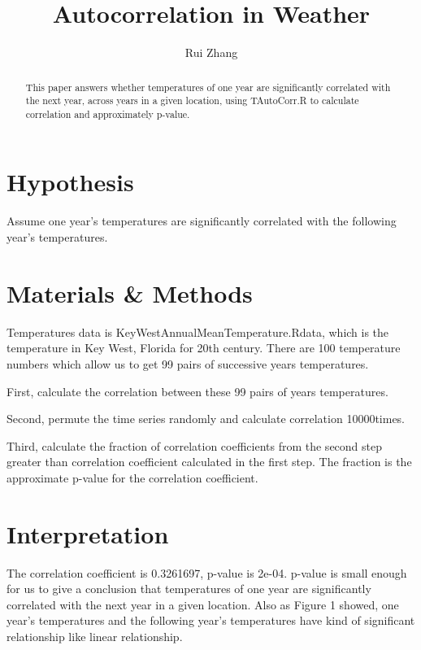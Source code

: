 \documentclass[12pt]{article}
\title{Autocorrelation in Weather}
\author{Rui Zhang}
\date{}
\begin{document}
  \maketitle
  
  \begin{abstract}
    This paper answers whether temperatures of one year are significantly correlated with the next year, across years in a given location, using TAutoCorr.R to calculate correlation and approximately p-value.
  \end{abstract}
  
  \section{Hypothesis}
    Assume one year's temperatures are significantly correlated with the following year's temperatures.
  
  \section{Materials \& Methods}
    Temperatures data is KeyWestAnnualMeanTemperature.Rdata, which is  the temperature in Key West, Florida for 20th century. There are 100 temperature numbers which allow us to get 99 pairs of successive years temperatures.
    
    First, calculate the correlation between these 99 pairs of years temperatures. 
    
    Second, permute the time series randomly and calculate correlation 10000times.
    
    Third, calculate the fraction of correlation coefficients from the second step greater than correlation coefficient calculated in the first step. The fraction is the approximate p-value for the correlation coefficient.
  
  \section{Interpretation}
  The correlation coefficient is 0.3261697, p-value is 2e-04. p-value is small enough for us to give a conclusion that temperatures of one year are significantly correlated with the next year in a given location. Also as Figure 1 showed, one year's temperatures and the following year's temperatures have kind of significant relationship like linear relationship.
\end{document}

